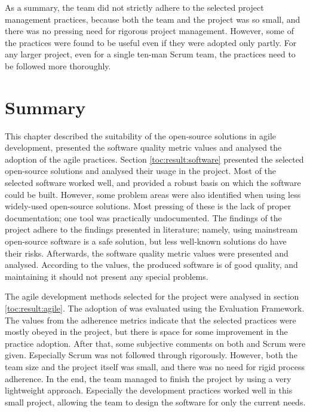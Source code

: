 As a summary, the team did not strictly adhere to the selected project 
management practices, because both the team and the project was so 
small, and there was no pressing need for rigorous project management. 
However, some of the practices were found to be useful even if they 
were adopted only partly. For any larger project, even for a single 
ten-man Scrum team, the practices need to be followed more thoroughly.


\section{Summary}
\label{toc:result:summary}

This chapter described the suitability of the open-source solutions in 
agile development, presented the software quality metric values and 
analysed the adoption of the agile practices. Section 
\ref{toc:result:software} presented the selected open-source solutions 
and analysed their usage in the project. Most of the selected software 
worked well, and provided a robust basis on which the software could 
be built. However, some problem areas were also identified when using 
less widely-used open-source solutions. Most pressing of these is the 
lack of proper documentation; one tool was practically undocumented. 
The findings of the project adhere to the findings presented in 
literature; namely, using mainstream open-source software is a safe 
solution, but less well-known  solutions do have their 
risks. Afterwards, the  software quality metric values were 
presented and analysed. According to the values, the produced 
software is of good quality, and maintaining it should not present any 
special problems.

The agile development methods selected for the project were analysed 
in section \ref{toc:result:agile}. The adoption of  was 
evaluated using the  Evaluation Framework. The values from 
the adherence metrics indicate that the selected  practices 
were mostly obeyed in the project, but there is space for some 
improvement in the practice adoption. After that, some subjective 
comments on both  and Scrum were given. Especially Scrum 
was not followed through rigorously. However, both the team size and 
the project itself was small, and there was no need for rigid process 
adherence. In the end, the team managed to finish the project by using 
a very lightweight approach. Especially the  development 
practices worked well in this small project, allowing the team to 
design the software for only the current needs.

